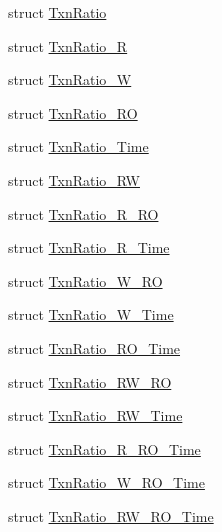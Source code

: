 \begin{DoxyCompactItemize}
\item 
struct \hyperlink{structanonymous__namespace_02cbr_8cpp_03_1_1TxnRatio}{Txn\-Ratio}
\item 
struct \hyperlink{structanonymous__namespace_02cbr_8cpp_03_1_1TxnRatio__R}{Txn\-Ratio\-\_\-\-R}
\item 
struct \hyperlink{structanonymous__namespace_02cbr_8cpp_03_1_1TxnRatio__W}{Txn\-Ratio\-\_\-\-W}
\item 
struct \hyperlink{structanonymous__namespace_02cbr_8cpp_03_1_1TxnRatio__RO}{Txn\-Ratio\-\_\-\-R\-O}
\item 
struct \hyperlink{structanonymous__namespace_02cbr_8cpp_03_1_1TxnRatio__Time}{Txn\-Ratio\-\_\-\-Time}
\item 
struct \hyperlink{structanonymous__namespace_02cbr_8cpp_03_1_1TxnRatio__RW}{Txn\-Ratio\-\_\-\-R\-W}
\item 
struct \hyperlink{structanonymous__namespace_02cbr_8cpp_03_1_1TxnRatio__R__RO}{Txn\-Ratio\-\_\-\-R\-\_\-\-R\-O}
\item 
struct \hyperlink{structanonymous__namespace_02cbr_8cpp_03_1_1TxnRatio__R__Time}{Txn\-Ratio\-\_\-\-R\-\_\-\-Time}
\item 
struct \hyperlink{structanonymous__namespace_02cbr_8cpp_03_1_1TxnRatio__W__RO}{Txn\-Ratio\-\_\-\-W\-\_\-\-R\-O}
\item 
struct \hyperlink{structanonymous__namespace_02cbr_8cpp_03_1_1TxnRatio__W__Time}{Txn\-Ratio\-\_\-\-W\-\_\-\-Time}
\item 
struct \hyperlink{structanonymous__namespace_02cbr_8cpp_03_1_1TxnRatio__RO__Time}{Txn\-Ratio\-\_\-\-R\-O\-\_\-\-Time}
\item 
struct \hyperlink{structanonymous__namespace_02cbr_8cpp_03_1_1TxnRatio__RW__RO}{Txn\-Ratio\-\_\-\-R\-W\-\_\-\-R\-O}
\item 
struct \hyperlink{structanonymous__namespace_02cbr_8cpp_03_1_1TxnRatio__RW__Time}{Txn\-Ratio\-\_\-\-R\-W\-\_\-\-Time}
\item 
struct \hyperlink{structanonymous__namespace_02cbr_8cpp_03_1_1TxnRatio__R__RO__Time}{Txn\-Ratio\-\_\-\-R\-\_\-\-R\-O\-\_\-\-Time}
\item 
struct \hyperlink{structanonymous__namespace_02cbr_8cpp_03_1_1TxnRatio__W__RO__Time}{Txn\-Ratio\-\_\-\-W\-\_\-\-R\-O\-\_\-\-Time}
\item 
struct \hyperlink{structanonymous__namespace_02cbr_8cpp_03_1_1TxnRatio__RW__RO__Time}{Txn\-Ratio\-\_\-\-R\-W\-\_\-\-R\-O\-\_\-\-Time}
\end{DoxyCompactItemize}
